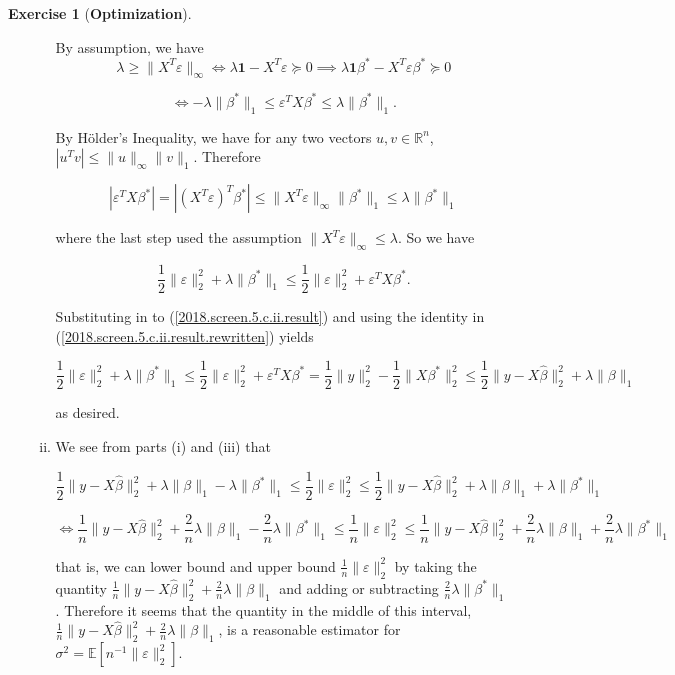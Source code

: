 \documentclass{article}
\theoremstyle{definition}
\newtheorem{exercise}{Exercise}
\theoremstyle{definition}
\theoremstyle{definition}
\theoremstyle{definition}
\theoremstyle{definition}
\renewcommand{\epsilon}{\varepsilon}
\newcommand{\E}{\mathbb{E}}
\renewcommand{\epsilon}{\varepsilon}
\begin{document}
\begin{exercise}[\textbf{Optimization}]
\begin{enumerate}[(a)]
\begin{enumerate}[(i)]
By assumption, we have 
\[
\lambda \geq \lVert X^T \epsilon \rVert_\infty \iff \lambda \boldsymbol{1}  - X^T \epsilon \succeq 0 \implies \lambda \boldsymbol{1} \beta^*  - X^T \epsilon \beta^* \succeq 0 
\]

\[
\iff - \lambda \lVert \beta^* \rVert_1 \leq \epsilon^T X \beta^* \leq \lambda \lVert \beta^* \rVert_1.
\]

By H\"{o}lder's Inequality, we have for any two vectors \(u, v \in \mathbb{R}^n\), \( | u^Tv | \leq \lVert u \rVert_\infty \lVert v \rVert_1\). Therefore

\[
| \epsilon^T X \beta^*| = | (X^T \epsilon)^T \beta^* | \leq \lVert X^T \epsilon \rVert_\infty \lVert \beta^* \rVert_1 \leq \lambda \lVert \beta^* \rVert_1
\]

where the last step used the assumption \(\lVert X^T \epsilon \rVert_\infty \leq \lambda\). So we have 

\[
 \frac{1}{2} \lVert \epsilon \rVert_2^2 +\lambda \lVert \beta^* \rVert_1 \leq \frac{1}{2} \lVert \epsilon \rVert_2^2 + \epsilon^T X \beta^* .
\]

Substituting in to (\ref{2018.screen.5.c.ii.result}) and using the identity in (\ref{2018.screen.5.c.ii.result.rewritten}) yields

\[
 \frac{1}{2} \lVert \epsilon \rVert_2^2 +\lambda \lVert \beta^* \rVert_1 \leq \frac{1}{2} \lVert \epsilon \rVert_2^2 + \epsilon^T X \beta^* = \frac{1}{2} \lVert y \rVert_2^2 - \frac{1}{2} \lVert X \beta^* \rVert_2^2  \leq \frac{1}{2} \lVert y - X \hat{\beta} \rVert_2^2 + \lambda \lVert \beta \rVert_1 
\]

as desired.

\item  We see from parts (i) and (iii) that

\[
\frac{1}{2} \lVert y - X \hat{\beta} \rVert_2^2 + \lambda \lVert \beta \rVert_1 - \lambda \lVert \beta^* \rVert_1  \leq \frac{1}{2} \lVert \epsilon \rVert_2^2 \leq  \frac{1}{2} \lVert y - X \hat{\beta} \rVert_2^2 + \lambda \lVert \beta \rVert_1 + \lambda \lVert \beta^* \rVert_1 
\]

\[
\iff \frac{1}{n} \lVert y - X \hat{\beta} \rVert_2^2 + \frac{2}{n} \lambda \lVert \beta \rVert_1 - \frac{2}{n}\lambda \lVert \beta^* \rVert_1  \leq \frac{1}{n} \lVert \epsilon \rVert_2^2 \leq  \frac{1}{n} \lVert y - X \hat{\beta} \rVert_2^2 + \frac{2}{n}\lambda \lVert \beta \rVert_1 +\frac{2}{n} \lambda \lVert \beta^* \rVert_1 
\]

that is, we can lower bound and upper bound \(\frac{1}{n} \lVert \epsilon \rVert_2^2 \) by taking the quantity \(\frac{1}{n} \lVert y - X \hat{\beta} \rVert_2^2 + \frac{2}{n} \lambda \lVert \beta \rVert_1\) and adding or subtracting \(\frac{2}{n}\lambda \lVert \beta^* \rVert_1\). Therefore it seems that the quantity in the middle of this interval,  \(\frac{1}{n} \lVert y - X \hat{\beta} \rVert_2^2 + \frac{2}{n} \lambda \lVert \beta \rVert_1\), is a reasonable estimator for \(\sigma^2 = \E \left[ n^{-1} \lVert \epsilon \rVert_2^2 \right]\).


\end{enumerate}
\end{enumerate}
\end{exercise}
\end{document}
